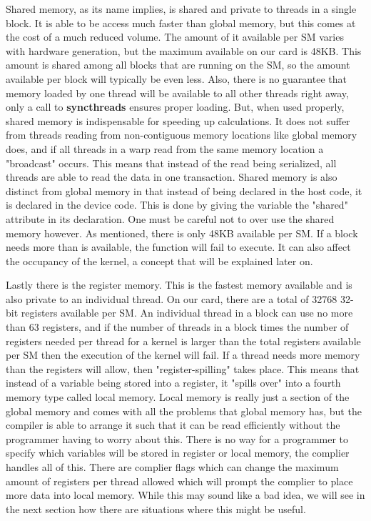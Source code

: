 \documentclass[12pt]{report}
\newcommand{\comm}[1]{\textbf{#1}}
\begin{document}
Shared memory, as its name implies, is shared and private to threads in a single block. It is able to be access much faster than global memory, but this comes at the cost of a much reduced volume. The amount of it available per SM varies with hardware generation, but the maximum available on our card is 48KB. This amount is shared among all blocks that are running on the SM, so the amount available per block will typically be even less. Also, there is no guarantee that memory loaded by one thread will be available to all other threads right away, only a call to \comm{syncthreads} ensures proper loading. But, when used properly, shared memory is indispensable for speeding up calculations. It does not suffer from threads reading from non-contiguous memory locations like global memory does, and if all threads in a warp read from the same memory location a "broadcast" occurs. This means that instead of the read being serialized, all threads are able to read the data in one transaction. Shared memory is also distinct from global memory in that instead of being declared in the host code, it is declared in the device code. This is done by giving the variable the "shared" attribute in its declaration. One must be careful not to over use the shared memory however. As mentioned, there is only 48KB available per SM. If a block needs more than is available, the function will fail to execute. It can also affect the occupancy of the kernel, a concept that will be explained later on.

Lastly there is the register memory. This is the fastest memory available and is also private to an individual thread. On our card, there are a total of 32768 32-bit registers available per SM. An individual thread in a block can use no more than 63 registers, and if the number of threads in a block times the number of registers needed per thread for a kernel is larger than the total registers available per SM then the execution of the kernel will fail. If a thread needs more memory than the registers will allow, then "register-spilling" takes place. This means that instead of a variable being stored into a register, it "spills over" into a fourth memory type called local memory. Local memory is really just a section of the global memory and comes with all the problems that global memory has, but the compiler is able to arrange it such that it can be read efficiently without the programmer having to worry about this. There is no way for a programmer to specify which variables will be stored in register or local memory, the complier handles all of this. There are complier flags which can change the maximum amount of registers per thread allowed which will prompt the complier to place more data into local memory. While this may sound like a bad idea, we will see in the next section how there are situations where this might be useful.
\end{document}
